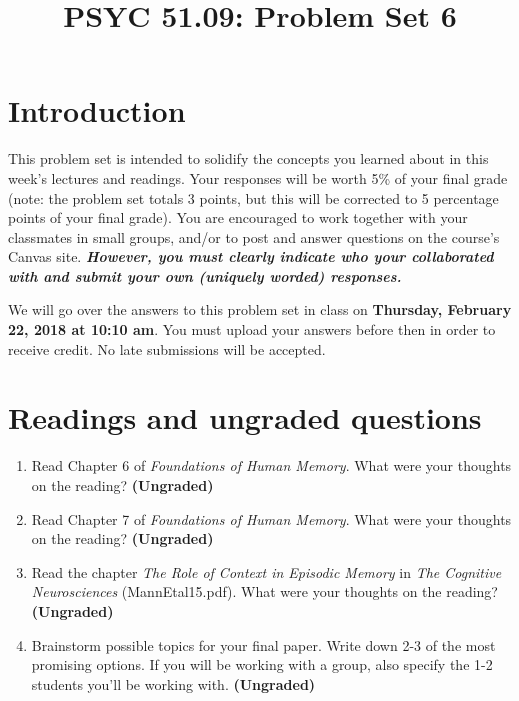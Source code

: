 \documentclass[11pt]{article}
\title{PSYC 51.09: Problem Set 6}
\date{}
\begin{document}
\maketitle
\vspace{-0.75in}
\section*{Introduction}
This problem set is intended to solidify the concepts you learned
about in this week's lectures and readings.  Your responses will be
worth 5\% of your final grade (note: the problem set totals 3 points,
but this will be corrected to 5 percentage points of your final
grade).  You are encouraged to work together with your classmates in
small groups, and/or to post and answer questions on the course’s
Canvas site.  \textbf{\textit{However, you must clearly indicate who
    your collaborated with and submit your own (uniquely worded)
    responses.}}

We will go over the answers to this problem set in class on
\textbf{Thursday, February 22, 2018 at 10:10 am}.  You must upload your answers before then in order to receive credit.  No late submissions will be accepted.

\section*{Readings and ungraded questions}
\begin{enumerate}
\item Read Chapter 6 of \textit{Foundations of Human Memory}.  What were your thoughts on the reading?
  \textbf{(Ungraded)}

\item Read Chapter 7 of \textit{Foundations of Human Memory}.  What were your thoughts on the reading?
  \textbf{(Ungraded)}

\item Read the chapter \textit{The Role of Context in Episodic Memory}
  in \textit{The Cognitive Neurosciences} (MannEtal15.pdf).  What were your thoughts on the reading?
  \textbf{(Ungraded)}

\item Brainstorm possible topics for your final paper.  Write down 2-3
  of the most promising options.  If you will be working with a group,
  also specify the 1-2 students you'll be working with. \textbf{(Ungraded)}
\end{enumerate}
\end{document}
